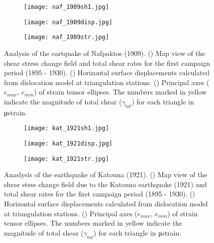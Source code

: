 \begin{extsum}
\begin{figure}[H]
\centering
\begin{subfigure}{.5\textwidth}
  \centering
      \texttt{[image: naf\_1909sh1.jpg]}
      \caption{}
      \label{fig_e:naf_1909sh1}
\end{subfigure}

\begin{subfigure}{.49\textwidth}
  \centering
      \texttt{[image: naf\_1909disp.jpg]}
      \caption{}
      \label{fig_e:naf_1909disp}
\end{subfigure}
\begin{subfigure}{.49\textwidth}
\centering
      \texttt{[image: naf\_1909str.jpg]}
      \caption{}
      \label{fig_e:naf_1909str}
\end{subfigure}
\caption{Analysis of the eartquake of Nafpaktos (1909). () Map view of the shear stress change field and total shear rates for the first campaign period (1895 - 1930). () Horizontal surface displacements calculated from \citet{Okada1985} dislocation model at triangulation stations. () Principal axes (${e}_{max}$, ${e}_{min}$) of strain tensor ellipses. The numbers marked in yellow indicate the magnitude of total  shear ($\gamma_{tot}$) for each triangle in μstrain.}
\label{fig_e:naf_1909}
\end{figure}

\begin{figure}[H]
\centering
\begin{subfigure}{.5\textwidth}
  \centering
      \texttt{[image: kat\_1921sh1.jpg]}
      \caption{}
      \label{fig_e:kat_1921sh1}
\end{subfigure}

\begin{subfigure}{.49\textwidth}
  \centering
      \texttt{[image: kat\_1921disp.jpg]}
      \caption{}
      \label{fig_e:kat_1921disp}
\end{subfigure}
\begin{subfigure}{.49\textwidth}
\centering
      \texttt{[image: kat\_1921str.jpg]}
      \caption{}
      \label{fig_e:kat_1921str}
\end{subfigure}
\caption{Anaslysis of the earthquake of Katouna (1921). () Map view of the shear stess change field due to the Katouna earthquake (1921) and total shear rates for the first campaign period (1895 - 1930). () Horizontal surface displacements calculated from \citet{Okada1985} dislocation model at triangulation stations. () Principal axes (${e}_{max}$, ${e}_{min}$) of strain tensor ellipses. The numbers marked in yellow indicate the magnitude of total shear ($\gamma_{tot}$) for each triangle in μstrain.}
\label{fig_e:kat_1921}
\end{figure}


\end{extsum}
